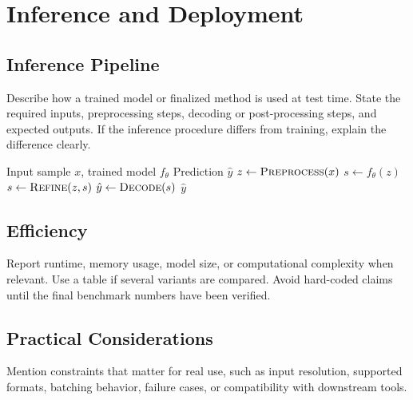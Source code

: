 \section{Inference and Deployment}

\subsection{Inference Pipeline}

Describe how a trained model or finalized method is used at test time.
State the required inputs, preprocessing steps, decoding or post-processing steps, and expected outputs.
If the inference procedure differs from training, explain the difference clearly.

\begin{algorithm}[t]
  \caption{\textbf{Illustrative inference procedure.} Replace the placeholder steps with the method's actual algorithm.}
  \label{alg:inference}
  \begin{algorithmic}[1]
    \Require Input sample $x$, trained model $f_{\theta}$
    \Ensure Prediction $\hat{y}$
    \State $z \gets \textsc{Preprocess}(x)$
    \State $s \gets f_{\theta}(z)$
      \State $s \gets \textsc{Refine}(z, s)$
    \EndIf
    \State $\hat{y} \gets \textsc{Decode}(s)$
    \State \Return $\hat{y}$
  \end{algorithmic}
\end{algorithm}

\subsection{Efficiency}

Report runtime, memory usage, model size, or computational complexity when relevant.
Use a table if several variants are compared.
Avoid hard-coded claims until the final benchmark numbers have been verified.

\subsection{Practical Considerations}

Mention constraints that matter for real use, such as input resolution, supported formats, batching behavior, failure cases, or compatibility with downstream tools.
